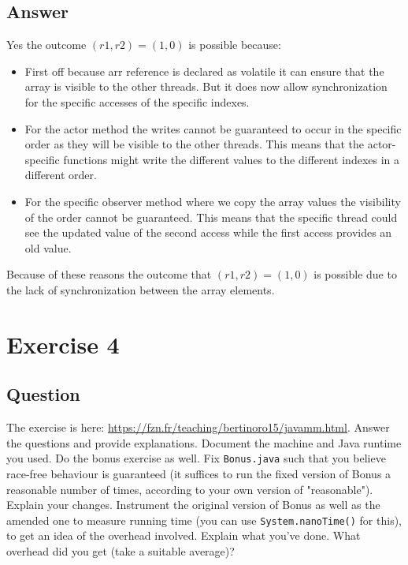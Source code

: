 \documentclass{article}
\begin{document}
\subsection*{Answer}
Yes the outcome $(r1, r2) = (1, 0)$ is possible because:

\begin{itemize}
    \item First off because arr reference is declared as volatile it can ensure that the array is visible to the other threads. But it does now allow synchronization for the specific accesses of the specific indexes.
    \item For the actor method the writes cannot be guaranteed to occur in the specific order as they will be visible to the other threads. This means that the actor-specific functions might write the different values to the different indexes in a different order.
    \item For the specific observer method where we copy the array values the visibility of the order cannot be guaranteed. This means that the specific thread could see the updated value of the second access while the first access provides an old value.
\end{itemize}

Because of these reasons the outcome that $(r1, r2) = (1, 0)$ is possible due to the lack of synchronization between the array elements.




\section*{Exercise 4}
\subsection*{Question}
The exercise is here: \url{https://fzn.fr/teaching/bertinoro15/javamm.html}. Answer the questions and provide explanations. Document the machine and Java runtime you used. Do the bonus exercise as well. Fix \texttt{Bonus.java} such that you believe race-free behaviour is guaranteed (it suffices to run the fixed version of Bonus a reasonable number of times, according to your own version of "reasonable"). Explain your changes. Instrument the original version of Bonus as well as the amended one to measure running time (you can use \texttt{System.nanoTime()} for this), to get an idea of the overhead involved. Explain what you’ve done. What overhead did you get (take a suitable average)?
\end{document}
